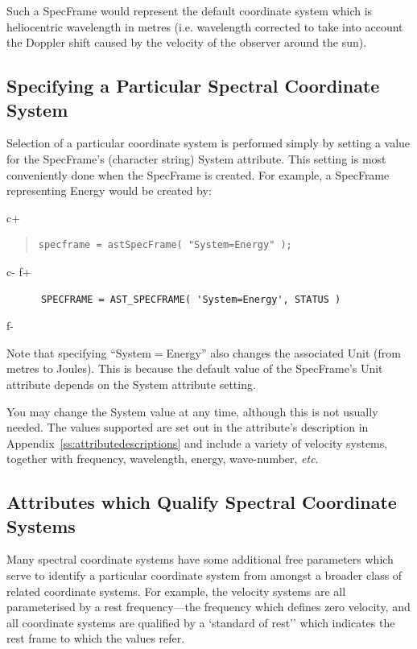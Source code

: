 \documentclass[twoside,11pt]{article}
\newcommand{\appref}[1]{Appendix~\ref{#1}}
\newcommand{\appref}[1]{\ref{#1}}
\begin{document}
Such a SpecFrame would represent the default coordinate system which is
heliocentric wavelength in metres (i.e. wavelength corrected to take into
account the Doppler shift caused by the velocity of the observer around the
sun).

\subsection{Specifying a Particular Spectral Coordinate System}

Selection of a particular coordinate system is performed simply by
setting a value for the SpecFrame's (character string) System
attribute. This setting is most conveniently done when the SpecFrame is
created. For example, a SpecFrame representing Energy would be created by:

c+
\begin{quote}
\small
\begin{verbatim}
specframe = astSpecFrame( "System=Energy" );
\end{verbatim}
\normalsize
\end{quote}
c-
f+
\small
\begin{verbatim}
      SPECFRAME = AST_SPECFRAME( 'System=Energy', STATUS )
\end{verbatim}
\normalsize
f-

Note that specifying ``System$=$Energy'' also changes the associated
Unit (from metres to Joules). This is because the default value
of the SpecFrame's Unit attribute depends on the System attribute setting.

You may change the System value at any time, although this is not
usually needed.  The values supported are set out in the attribute's
description in \appref{ss:attributedescriptions} and include a variety
of velocity systems, together with frequency, wavelength, energy,
wave-number, \emph{etc}.

\subsection{Attributes which Qualify Spectral Coordinate Systems}

Many spectral coordinate systems have some additional free parameters
which serve to identify a particular coordinate system from amongst a
broader class of related coordinate systems. For example, the
velocity systems are all parameterised by a rest frequency---the
frequency which defines zero velocity, and all coordinate systems
are qualified by a `standard of rest'' which indicates the rest frame to
which the values refer.
\end{document}
